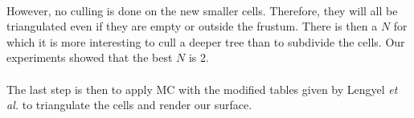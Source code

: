 \paragraph{}
However, no culling is done on the new smaller cells.
Therefore, they will all be triangulated even if they are empty or outside the frustum. 
There is then a $N$ for which it is more interesting to cull a deeper tree than to subdivide the cells. 
Our experiments showed that the best $N$ is 2.

\paragraph{}
The last step is then to apply MC with the modified tables given by Lengyel \textit{et al.} to triangulate the cells and render our surface.
